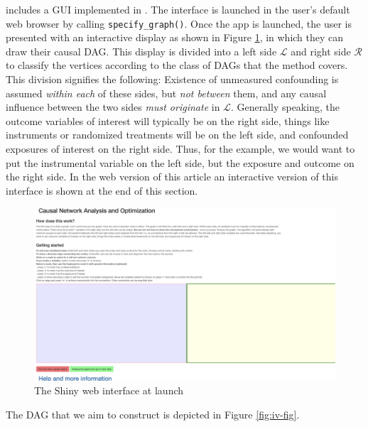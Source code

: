  includes a GUI implemented in  \citep{shiny}. The interface is launched in the user's default web browser by calling \texttt{specify\_graph()}.
Once the  app is launched, the user is presented with an interactive display as shown in Figure \ref{fig:InterfaceStart}, in which they can draw their causal DAG. This display is divided into a left side \(\mathcal{L}\) and right side \(\mathcal{R}\) to classify the vertices according to the class of DAGs that the method covers. This division signifies the following: Existence of unmeasured confounding is assumed \emph{within each} of these sides, but \emph{not between} them, and any causal influence between the two sides \emph{must originate} in \(\mathcal{L}\). Generally speaking, the outcome variables of interest will typically be on the right side, things like instruments or randomized treatments will be on the left side, and confounded exposures of interest on the right side. Thus, for the example, we would want to put the instrumental variable on the left side, but the exposure and outcome on the right side. In the web version of this article an interactive version of this interface is shown at the end of this section.

\begin{figure}

{\centering \includegraphics[width=1\linewidth]{figures/InterfaceStart2} 

}

\caption{The Shiny web interface at launch}\label{fig:InterfaceStart}
\end{figure}

The DAG that we aim to construct is depicted in Figure \ref{fig:iv-fig}.

